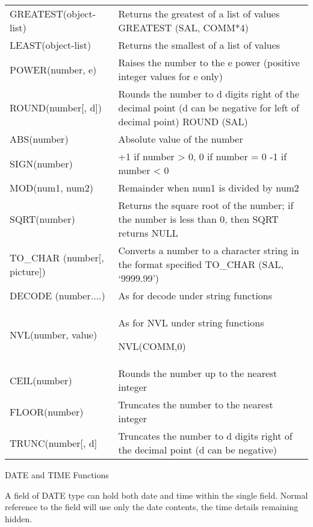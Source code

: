 \begin{flushleft}
\tablefirsthead{}
\tablehead{}
\tabletail{}
\tablelasttail{}
\begin{supertabular}{m{5.4900002cm}m{10.052cm}}
GREATEST(object-list) &
Returns the greatest of a list of values  GREATEST (SAL, COMM*4)\\
LEAST(object-list) &
Returns the smallest of a list of values\\
POWER(number, e) &
Raises the number to the e power (positive integer values for e only)\\
ROUND(number[, d]) &
Rounds the number to d digits right of the decimal point (d can be negative for left of decimal point) ROUND (SAL)\\
ABS(number) &
Absolute value of the number\\
SIGN(number) &
+1 if number {\textgreater} 0, 0 if number = 0  {}-1 if number {\textless} 0\\
MOD(num1, num2) &
Remainder when num1 is divided by num2\\
SQRT(number) &
Returns the square root of the number; if the number is less than 0, then SQRT returns NULL\\
TO\_CHAR (number[, picture]) &
Converts a number to a character string in the format specified TO\_CHAR (SAL, `9999.99')\\
DECODE (number....) &
As for decode under string functions\\
NVL(number, value) &
As for NVL under string functions

NVL(COMM,0)\\
CEIL(number) &
Rounds the number up to the nearest integer\\
FLOOR(number) &
Truncates the number to the nearest integer\\
TRUNC(number[, d] &
Truncates the number to d digits right of the decimal point (d can be negative)\\
\end{supertabular}
\end{flushleft}
DATE  and TIME Functions

A field of DATE type can hold both date and time within the single field.  Normal reference to the field will use only the date contents, the time details remaining hidden.

